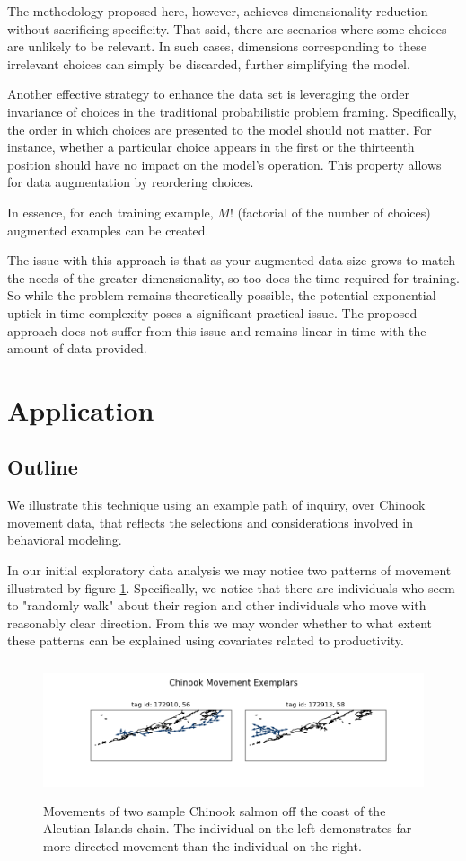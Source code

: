 \documentclass[11pt]{article}
\begin{document}
The methodology proposed here, however, achieves dimensionality reduction without sacrificing specificity. That said, there are scenarios where some choices are unlikely to be relevant. In such cases, dimensions corresponding to these irrelevant choices can simply be discarded, further simplifying the model.

Another effective strategy to enhance the data set is leveraging the order invariance of choices in the traditional probabilistic problem framing. Specifically, the order in which choices are presented to the model should not matter. For instance, whether a particular choice appears in the first or the thirteenth position should have no impact on the model's operation. This property allows for data augmentation by reordering choices.

In essence, for each training example, $M!$ (factorial of the number of choices) augmented examples can be created.

The issue with this approach is that as your augmented data size grows to match the needs of the greater dimensionality, so too does the time required for training. So while the problem remains theoretically possible, the potential exponential uptick in time complexity poses a significant practical issue. The proposed approach does not suffer from this issue and remains linear in time with the amount of data provided. 
\section*{Application}

\subsection*{Outline}

We illustrate this technique using an example path of inquiry, over Chinook movement data, that reflects the selections and considerations involved in behavioral modeling.

In our initial exploratory data analysis we may notice two patterns of movement illustrated by figure \ref{fig:exemplars}. Specifically, we notice that there are individuals who seem to "randomly walk" about their region and other individuals who move with reasonably clear direction. From this we may wonder whether to what extent these patterns can be explained using covariates related to productivity. 

\begin{figure}[h!] 
	\centering
  \includegraphics[height=40mm]{figures/exemplars.png}
  \caption{Movements of two sample Chinook salmon off the coast of the Aleutian Islands chain. The individual on the left demonstrates far more directed movement than the individual on the right.}
  \label{fig:exemplars}
\end{figure}
\end{document}
